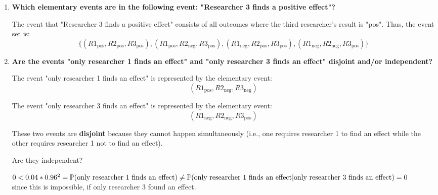 \documentclass[a4paper, 12pt]{article}
\begin{document}
\begin{enumerate}
Here "$+$" stands for "pos" and "$-$" for "neg". The first entry belongs to researcher 1, the second to researcher 2, the third to researcher 3.
    \item \textbf{Which elementary events are in the following event: "Researcher 3 finds a positive effect"?}
    
    The event that "Researcher 3 finds a positive effect" consists of all outcomes where the third researcher's result is "pos". Thus, the event set is:
    \[
    \{(R1_{\text{pos}}, R2_{\text{pos}}, R3_{\text{pos}}), (R1_{\text{pos}}, R2_{\text{neg}}, R3_{\text{pos}}), (R1_{\text{neg}}, R2_{\text{pos}}, R3_{\text{pos}}), (R1_{\text{neg}}, R2_{\text{neg}}, R3_{\text{pos}})\}
    \]
    
    \item \textbf{Are the events "only researcher 1 finds an effect" and "only researcher 3 finds an effect" disjoint and/or independent?}
    
    The event "only researcher 1 finds an effect" is represented by the elementary event:
    \[
    (R1_{\text{pos}}, R2_{\text{neg}}, R3_{\text{neg}})
    \]
    
    The event "only researcher 3 finds an effect" is represented by the elementary event:
    \[
    (R1_{\text{neg}}, R2_{\text{neg}}, R3_{\text{pos}})
    \]
    
    These two events are \textbf{disjoint} because they cannot happen simultaneously (i.e., one requires researcher 1 to find an effect while the other requires researcher 1 not to find an effect). 
    
    Are they independent?
    
    $0 < 0.04*0.96^2 = \\
    \mathbb{P}(\text{only researcher 1 finds an effect}) \neq \\
    \mathbb{P}(\text{only researcher 1 finds an effect}|\text{only researcher 3 finds an effect}) = 0$ \\
    since this is impossible, if only researcher 3 found an effect.
    
    
    
\end{enumerate}
\end{document}

